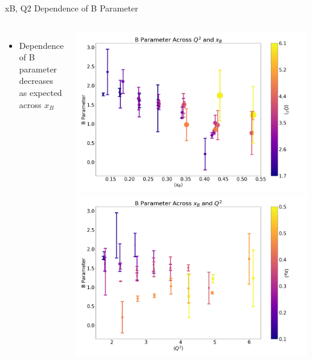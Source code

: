 \documentclass[aspectratio=169]{beamer}
\begin{document}
\begin{frame}{xB, Q2 Dependence of B Parameter}

            \begin{columns}
                    
                        \begin{itemize}
                            \setlength\itemsep{.5em}
                \item Dependence of B parameter decreases as expected across $x_B$
                
                \end{itemize}

            
                        \includegraphics[width=0.99\textwidth]{defense/B_vs_Q2_and_xB.png}
                         \includegraphics[width=0.99\textwidth]{defense/B_vs_xB_and_Q2.png}
            
\end{columns}
\end{frame}
\end{document}
